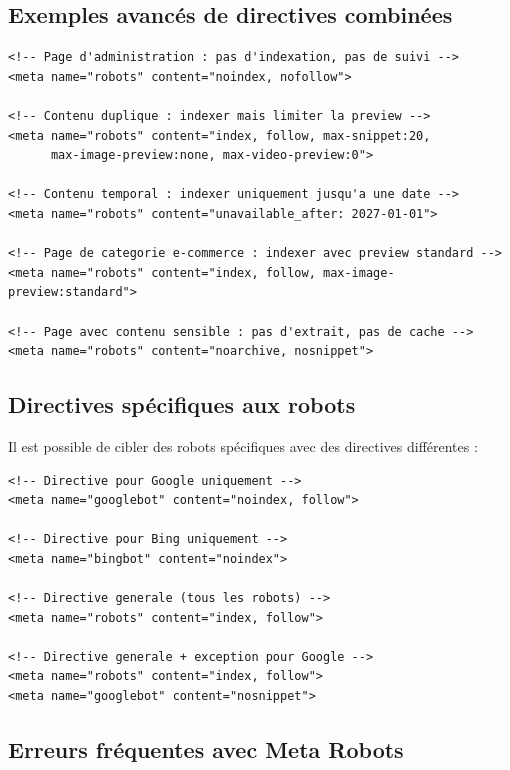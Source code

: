 \documentclass[12pt,a4paper,twoside]{report}
\begin{document}
\subsection{Exemples avancés de directives combinées}

\begin{lstlisting}[style=htmlcode,caption={Directives Meta Robots avancées}]
<!-- Page d'administration : pas d'indexation, pas de suivi -->
<meta name="robots" content="noindex, nofollow">

<!-- Contenu duplique : indexer mais limiter la preview -->
<meta name="robots" content="index, follow, max-snippet:20,
      max-image-preview:none, max-video-preview:0">

<!-- Contenu temporal : indexer uniquement jusqu'a une date -->
<meta name="robots" content="unavailable_after: 2027-01-01">

<!-- Page de categorie e-commerce : indexer avec preview standard -->
<meta name="robots" content="index, follow, max-image-preview:standard">

<!-- Page avec contenu sensible : pas d'extrait, pas de cache -->
<meta name="robots" content="noarchive, nosnippet">
\end{lstlisting}

\subsection{Directives spécifiques aux robots}

Il est possible de cibler des robots spécifiques avec des directives différentes :

\begin{lstlisting}[style=htmlcode,caption={Directives ciblées par robot}]
<!-- Directive pour Google uniquement -->
<meta name="googlebot" content="noindex, follow">

<!-- Directive pour Bing uniquement -->
<meta name="bingbot" content="noindex">

<!-- Directive generale (tous les robots) -->
<meta name="robots" content="index, follow">

<!-- Directive generale + exception pour Google -->
<meta name="robots" content="index, follow">
<meta name="googlebot" content="nosnippet">
\end{lstlisting}

\subsection{Erreurs fréquentes avec Meta Robots}
\end{document}
